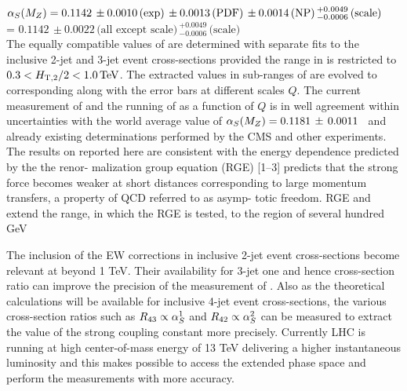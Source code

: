 $\alpha_S(M_Z) = 0.1142\,\pm0.0010\,\textrm{(exp)}\,\pm0.0013\,\textrm{(PDF)}\,\pm0.0014\,\textrm{(NP)}\,^{+0.0049}_{-0.0006}\,\textrm{(scale)}$ \\ \hspace*{24mm} = $0.1142\,\pm0.0022\,\textrm{(all except scale)}\,^{+0.0049}_{-0.0006}\,\textrm{(scale)}$\\ 
The equally compatible values of \alpsmz are determined with separate fits to the inclusive 2-jet and 3-jet event cross-sections provided the range in \httwo is restricted to $0.3 < H_{\mathrm{T,2}}/2 < 1.0\,\text{Te\hspace{-.08em}V}$. The extracted \alpsmz values in sub-ranges of \httwo are evolved to corresponding \alpsq along with the error bars at different scales $Q$. The current measurement of \alpsmz and the running of \alpsq as a function of $Q$ is in well agreement within uncertainties with the world average value of $\alpha_S(M_Z) = 0.1181 \,\pm\, 0.0011$~\cite{Patrignani:2016xqp} and already existing determinations performed by the CMS and other experiments. The results on \alps reported here are consistent with the energy dependence predicted by the the renor-
malization group equation (RGE) [1–3] predicts that the strong force becomes weaker at short
distances corresponding to large momentum transfers, a property of QCD referred to as asymp-
totic freedom.  RGE and extend the range, in which the RGE is tested, to the region of several hundred  GeV

The inclusion of the EW corrections in inclusive 2-jet event cross-sections become relevant at \httwo beyond 1 TeV. Their availability for 3-jet one and hence cross-section ratio \ratio can improve the precision of the measurement of \alpsmz. Also as the theoretical calculations will be available for inclusive 4-jet event cross-sections, the various cross-section ratios such as $R_{\rm 43} \propto \alpha_S^1$ and $R_{\rm 42} \propto \alpha_S^2$ can be measured to extract the value of the strong coupling constant more precisely. Currently LHC is running at high center-of-mass energy of 13 TeV delivering a higher instantaneous luminosity and this makes possible to access the extended phase space and perform the measurements with more accuracy.
